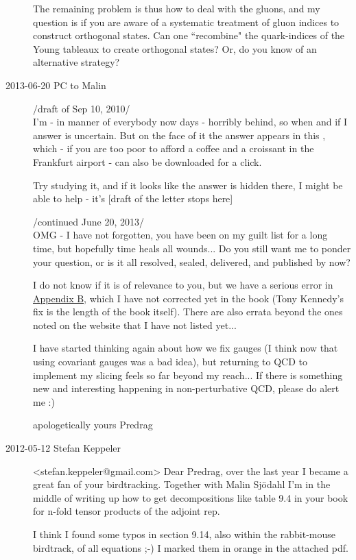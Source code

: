 \begin{description}
The remaining problem is thus how to deal with the gluons, and my question is
if you are aware of a systematic treatment of gluon indices to construct
orthogonal states. Can one ``recombine" the quark-indices of the Young
tableaux to create orthogonal states? Or, do you know of an alternative
strategy?

\item[2013-06-20 PC to Malin]

                           /draft of Sep 10, 2010/\\
I'm - in manner of everybody now days - horribly behind, so when and if I
answer is uncertain. But on the face of it the answer appears in this
, which - if you are too poor to
afford a coffee and a croissant in the Frankfurt airport - can also be
downloaded for a click.

Try studying it, and if it looks like the answer is hidden there, I might be
able to help - it's [draft of the letter stops here]

                          /continued June 20, 2013/\\
OMG - I have not forgotten, you have been on my guilt list for a long time,
but hopefully time heals all wounds... Do you still want me to ponder your
question, or is it all resolved, sealed, delivered, and published by now?

I do not know if it is of relevance to you, but we have a serious error in
\href{http://birdtracks.eu/extras/reviews.html}{Appendix B}, which I have not
corrected yet in the book (Tony Kennedy's fix is the length of the book
itself). There are also errata beyond the ones noted on the website that I
have not listed yet...

I have started thinking again about how we fix gauges (I think now that using
covariant gauges was a bad idea), but returning to QCD to implement my
slicing feels so far beyond my reach... If there is something new and
interesting happening in non-perturbative QCD, please do alert me :)

apologetically yours
Predrag


\item[2012-05-12 Stefan Keppeler] <stefan.keppeler@gmail.com>
Dear Predrag,
over the last year I became a great fan of your birdtracking. Together
with Malin Sj{\"o}dahl I'm in the middle of writing up how to get
decompositions like table 9.4 in your book for n-fold tensor products
of the adjoint rep.

I think I found some typos in section 9.14, also within the rabbit-mouse
birdtrack, of all equations ;-) I marked them in orange in the
 {attached pdf}.


\end{description}

